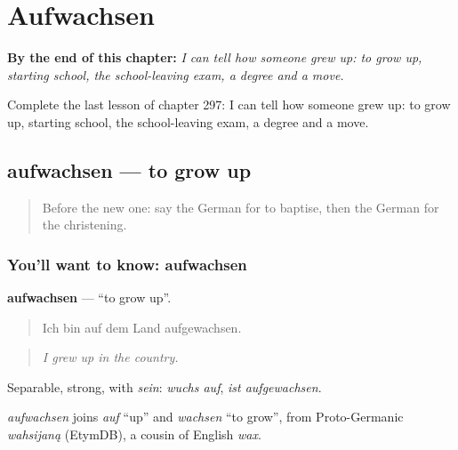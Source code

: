 
\chapter{Aufwachsen}
\label{ch:ge-aufwachsen}

\begin{chapteropening}
\textbf{By the end of this chapter:} \emph{I can tell how someone grew up: to grow up, starting school, the school-leaving exam, a degree and a move.}

Complete the last lesson of chapter 297: I can tell how someone grew up: to grow up, starting school, the school-leaving exam, a degree and a move.
\end{chapteropening}

\section[aufwachsen]{aufwachsen — to grow up}

\label{lesson:GE-C297-aufwachsen}



\begin{quote}
Before the new one: say the German for to baptise, then the German for the christening.
\end{quote}

\subsection*{You'll want to know: aufwachsen}
\textbf{aufwachsen} — \textquotedblleft{}to grow up\textquotedblright{}.

\begin{quote}
Ich bin auf dem Land aufgewachsen.
\end{quote}

\begin{quote}
\emph{I grew up in the country.}
\end{quote}

Separable, strong, with \emph{sein}: \emph{wuchs auf}, \emph{ist aufgewachsen}.

\begin{cousinweb}
\emph{aufwachsen} joins \emph{auf} \textquotedblleft{}up\textquotedblright{} and \emph{wachsen} \textquotedblleft{}to grow\textquotedblright{}, from Proto-Germanic \emph{wahsijaną} (EtymDB), a cousin of English \emph{wax}.
\end{cousinweb}

